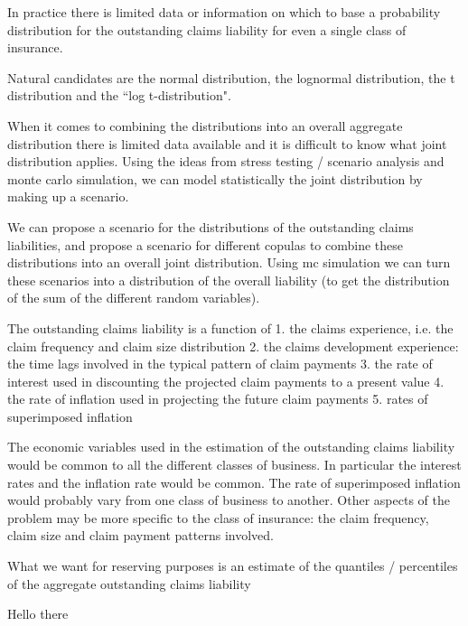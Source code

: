 \documentclass[12pt,a4paper]{article}
\begin{document}
In practice there is limited data or information on which to base a probability distribution for the outstanding claims liability for even a single class of insurance.

Natural candidates are the normal distribution, the lognormal distribution, the t distribution and the ``log t-distribution".

When it comes to combining the distributions into an overall aggregate distribution there is limited data available and it is difficult to know what joint distribution applies.
Using the ideas from stress testing / scenario analysis and monte carlo simulation, we can model statistically the joint distribution by making up a scenario.

We can propose a scenario for the distributions of the outstanding claims liabilities, and propose a scenario for different copulas to combine these distributions into an overall joint distribution. Using mc simulation we can turn these scenarios into a distribution of the overall liability (to get the distribution of the sum of the different random variables).

The outstanding claims liability is a function of
1.	the claims experience, i.e. the claim frequency and claim size distribution
2.	the claims development experience: the time lags involved in the typical pattern of claim payments
3.	the rate of interest used in discounting the projected claim payments to a present value
4.	the rate of inflation used in projecting the future claim payments
5.	rates of superimposed inflation

The economic variables used in the estimation of the outstanding claims liability would be common to all the different classes of business. In particular the interest rates and the inflation rate would be common. The rate of superimposed inflation would probably vary from one class of business to another. Other aspects of the problem may be more specific to the class of insurance: the claim frequency, claim size and claim payment patterns involved.

What we want for reserving purposes is an estimate of the quantiles / percentiles of the aggregate outstanding claims liability

Hello there
\end{document}
